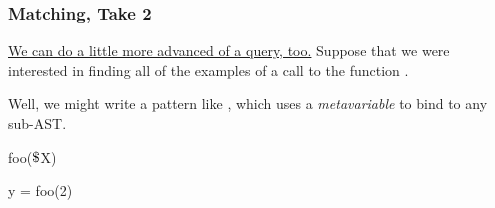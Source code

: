 \documentclass[aspectratio=169, handout]{beamer}
\newcommand{\dollar}{\mbox{\textdollar}}
\begin{document}
 \begin{frame}[fragile]
   \frametitle{Matching, Take 2}

   \begin{center}
     \begin{minipage}[t][0.21\textheight][t]{\textwidth}
       \raggedright
       {\color{blue}\href{https://semgrep.dev/playground/s/JDqJQ}{We can do a little more advanced of a query, too.}} Suppose that we were
       interested in finding all of the examples of a call to the function
       .

       \vspace{5pt}

       Well, we might write a pattern like \code{ref $\,\,\dollar$X}, which uses a
       \textit{metavariable} to bind to any sub-AST.
     \end{minipage}
     \begin{minipage}[t][0.515\textheight][t]{\textwidth}
       \begin{minipage}{0.48\textwidth}
         \centering
       \end{minipage}
       \begin{minipage}{0.48\textwidth}
         \centering
       \end{minipage}
     \end{minipage}
     \begin{minipage}[t][0.3\textheight][t]{\textwidth}
       \begin{minipage}{0.48\textwidth}
         \centering
         \begin{codeblock}
           foo($\dollar$X)
         \end{codeblock}
       \end{minipage}
       \begin{minipage}{0.48\textwidth}
         \begin{codeblock}
           y = foo(2)
         \end{codeblock}
       \end{minipage}
     \end{minipage}
   \end{center}
 \end{frame}
\end{document}
